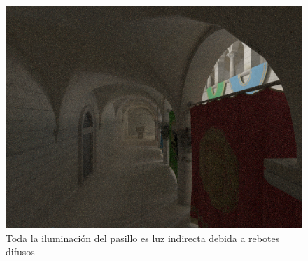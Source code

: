 \clearpage

\begin{figure}
\centering
\includegraphics[width=5in]{indirect.png}
\caption{Toda la iluminación del pasillo es luz indirecta debida a rebotes difusos}
\end{figure}

\nocite{Ashikhmin2000}
\nocite{Cook1984}
\nocite{Dutre2003}
\nocite{Torrance1967}
\nocite{Torrance1967}
\nocite{Veach1995}
\nocite{Walter2007}
